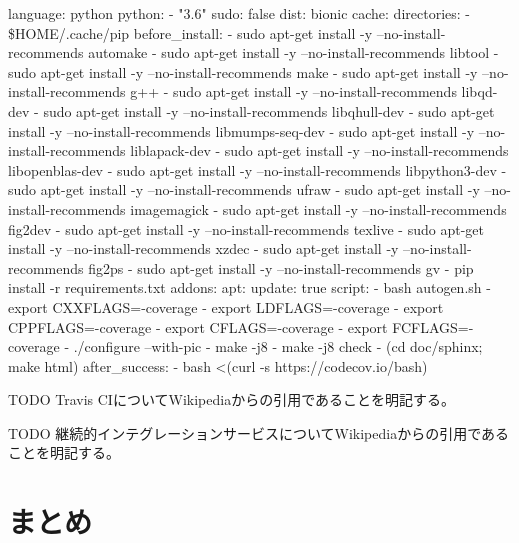 \documentclass{ltjoc}
\begin{document}
language: python
python:
  - "3.6"
sudo: false
dist: bionic
cache:
  directories:
  - \$HOME/.cache/pip
before\_install:
- sudo apt-get install -y --no-install-recommends automake
- sudo apt-get install -y --no-install-recommends libtool
- sudo apt-get install -y --no-install-recommends make
- sudo apt-get install -y --no-install-recommends g++
- sudo apt-get install -y --no-install-recommends libqd-dev
- sudo apt-get install -y --no-install-recommends libqhull-dev
- sudo apt-get install -y --no-install-recommends libmumps-seq-dev
- sudo apt-get install -y --no-install-recommends liblapack-dev
- sudo apt-get install -y --no-install-recommends libopenblas-dev
- sudo apt-get install -y --no-install-recommends libpython3-dev
- sudo apt-get install -y --no-install-recommends ufraw
- sudo apt-get install -y --no-install-recommends imagemagick
- sudo apt-get install -y --no-install-recommends fig2dev
- sudo apt-get install -y --no-install-recommends texlive
- sudo apt-get install -y --no-install-recommends xzdec
- sudo apt-get install -y --no-install-recommends fig2ps
- sudo apt-get install -y --no-install-recommends gv
- pip install -r requirements.txt
addons:
  apt:
    update: true
script:
- bash autogen.sh
- export CXXFLAGS=-coverage
- export LDFLAGS=-coverage
- export CPPFLAGS=-coverage
- export CFLAGS=-coverage
- export FCFLAGS=-coverage
- ./configure --with-pic
- make -j8
- make -j8 check
- (cd doc/sphinx; make html)
after\_success:
- bash <(curl -s https://codecov.io/bash)

TODO Travis CIについてWikipediaからの引用であることを明記する。

TODO 継続的インテグレーションサービスについてWikipediaからの引用であることを明記する。
\section{まとめ}


\end{document}
